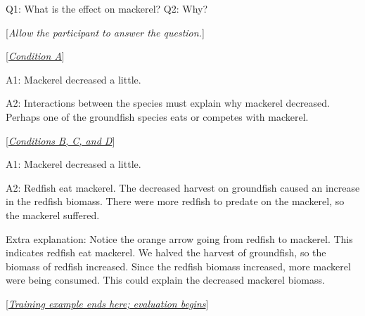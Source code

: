 {{{Q1: What is the effect on mackerel?  Q2: Why?

[\textit{Allow the participant to answer the question.}]

\begin{minipage}[t]{0.45\textwidth}
{\setlength{\parskip}{1em}
[\underline{\textit{Condition A}}]

A1: Mackerel decreased a little.

A2: Interactions between the species must explain why mackerel decreased.  Perhaps one of the groundfish species eats or competes with mackerel.
} \end{minipage} \qquad
\begin{minipage}[t]{0.45\textwidth}
{\setlength{\parskip}{1em}
[\underline{\textit{Conditions B, C, and D}}]

A1: Mackerel decreased a little.

A2: Redfish eat mackerel.  The decreased harvest on groundfish caused an increase in the redfish biomass. There were more redfish to predate on the mackerel, so the mackerel suffered.

Extra explanation: Notice the orange arrow going from redfish to mackerel.  This indicates redfish eat mackerel. We halved the harvest of groundfish, so the biomass of redfish increased.  Since the redfish biomass increased, more mackerel were being consumed.  This could explain the decreased mackerel biomass.
} \end{minipage}

[\underline{\textit{Training example ends here; evaluation begins}}]

}}}


